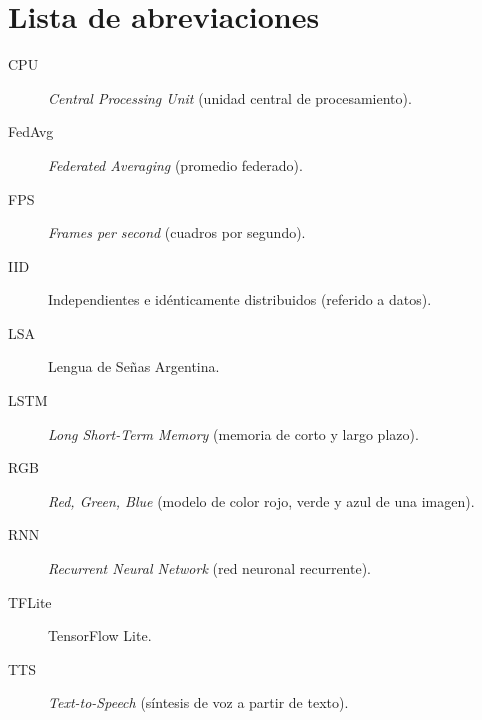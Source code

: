 \chapter*{Lista de abreviaciones}

\begin{description}
    \item[CPU] \emph{Central Processing Unit} (unidad central de procesamiento).
    \item[FedAvg] \emph{Federated Averaging} (promedio federado).
    \item[FPS] \emph{Frames per second} (cuadros por segundo).
    \item[IID] Independientes e idénticamente distribuidos (referido a datos).
    \item[LSA] Lengua de Señas Argentina.
    \item[LSTM] \emph{Long Short-Term Memory} (memoria de corto y largo plazo).
    \item[RGB] \emph{Red, Green, Blue} (modelo de color rojo, verde y azul de una imagen).
    \item[RNN] \emph{Recurrent Neural Network} (red neuronal recurrente).
    \item[TFLite] TensorFlow Lite.
    \item[TTS] \emph{Text-to-Speech} (síntesis de voz a partir de texto).
\end{description}
